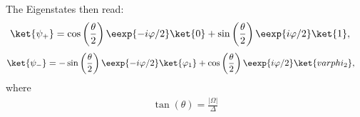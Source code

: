 The Eigenstates then read:
\begin{align}
				\ket{\psi_+}&=\cos\left(\frac{\theta}{2}\right) \eexp{-i{\varphi}/{2}}\ket{0}+\sin\left(\frac{\theta}{2}\right) \eexp{i{\varphi}/{2}}\ket{1}, \label{eq:staticpsiplus}
\end{align}
\begin{align}
				\ket{\psi_-}&=-\sin\left(\frac{\theta}{2}\right) \eexp{-i{\varphi}/{2}}\ket{\varphi_1}+\cos\left(\frac{\theta}{2}\right) \eexp{i{\varphi}/{2}}\ket{varphi_2}, \label{eq:staticpsiminus}
\end{align}
where 
\begin{align} \label{eq:parameters}
	\tan(\theta) = \frac{|\Omega|}{\Delta} 
\end{align}